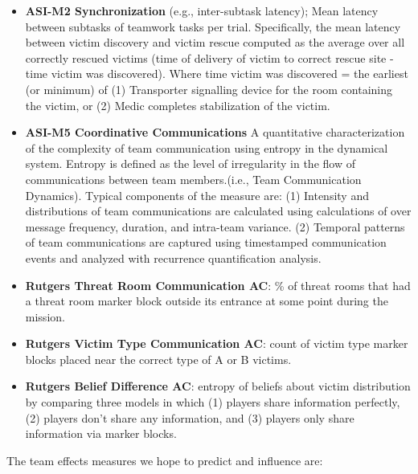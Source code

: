 \begin{itemize}

    \item \textbf{ASI-M2 Synchronization} (e.g., inter-subtask latency);
        Mean latency between subtasks of teamwork tasks per
        trial. Specifically, the mean latency between victim discovery and
        victim rescue computed as the average over all correctly rescued
        victims (time of delivery of victim to correct rescue site - time
        victim was discovered). Where time victim was discovered = the earliest
        (or minimum) of (1) Transporter signalling device for the room
        containing the victim, or (2) Medic completes stabilization of the
        victim.
 
    \item \textbf{ASI-M5 Coordinative Communications} A quantitative
        characterization of the complexity of team communication using entropy
        in the dynamical system. Entropy is defined as the level of
        irregularity in the flow of communications between team members.(i.e.,
        Team Communication Dynamics).  Typical components of the measure are:
        (1) Intensity and distributions of team communications are calculated
        using calculations of over message frequency, duration, and intra-team
        variance. (2) Temporal patterns of team communications are captured
        using timestamped communication events and analyzed with recurrence
        quantification analysis.

    \item \textbf{Rutgers Threat Room Communication AC}: \% of threat
        rooms that had a threat room marker block outside its entrance at some
        point during the mission.        

    \item \textbf{Rutgers Victim Type Communication AC}: count of
        victim type marker blocks placed near the correct type of A or B
        victims.
    
    \item \textbf{Rutgers Belief Difference AC}: entropy of beliefs about
        victim distribution by comparing three models in which (1) players
        share information perfectly, (2) players don't share any information,
        and (3) players only share information via marker blocks.  

\end{itemize}

\noindent The team effects measures we hope to predict and influence are: 

